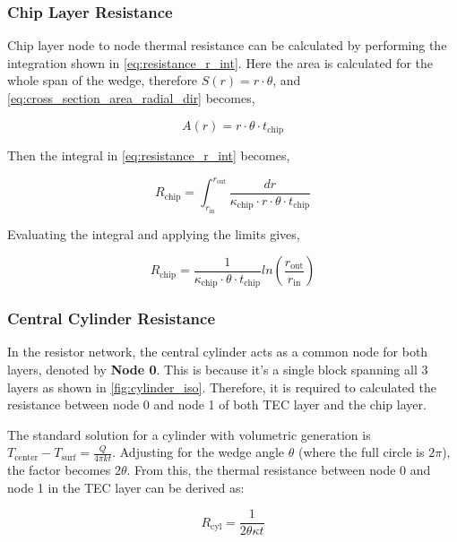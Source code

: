 \documentclass[10pt,a4paper,twocolumn]{article}
\begin{document}
\subsubsection{Chip Layer Resistance}

Chip layer node to node thermal resistance can be calculated by performing the integration shown in \cref{eq:resistance_r_int}. Here the area is calculated for the whole span of the wedge, therefore $S(r) = r\cdot\theta$, and \cref{eq:cross_section_area_radial_dir} becomes,

\begin{equation*}
	A(r) =  r\cdot\theta\cdot t_{\text{chip}}
\end{equation*}

Then the integral in \cref{eq:resistance_r_int} becomes,

\begin{equation*}
	R_{\text{chip}} = \int_{r_{\text{in}}}^{r_{\text{out}}} \frac{dr}{\kappa_{\text{chip}} \cdot r\cdot\theta\cdot t_{\text{chip}}}
\end{equation*}

Evaluating the integral and applying the limits gives,

\begin{equation}
	R_{\text{chip}} = \frac{1}{\kappa_{\text{chip}} \cdot\theta\cdot t_{\text{chip}}}ln\left( \frac{r_{\text{out}}}{r_{\text{in}}}\right)
\end{equation}

\subsubsection{Central Cylinder Resistance}

In the resistor network, the central cylinder acts as a common node for both layers, denoted by \textbf{Node 0}. This is because it's a single block spanning all 3 layers as shown in \cref{fig:cylinder_iso}. Therefore, it is required to calculated the resistance between node 0 and node 1 of both TEC layer and the chip layer.

The standard solution for a cylinder with volumetric generation is $T_{\text{center}} - T_{\text{surf}} = \frac{Q}{4\pi k t}$. Adjusting for the wedge angle $\theta$ (where the full circle is $2\pi$), the factor becomes $2\theta$. From this, the thermal resistance between node 0 and node 1 in the TEC layer can be derived as:

\begin{equation}
	R_{\text{cyl}} = \frac{1}{2\theta \kappa t}
	\label{eq:cyl_Resistance1}
\end{equation}
\end{document}
